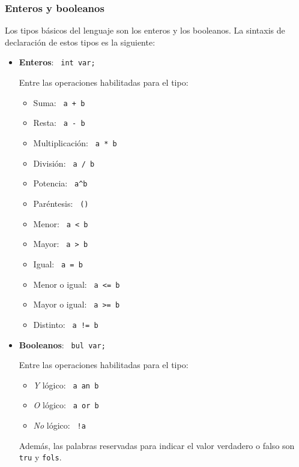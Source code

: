 \documentclass[10pt,a4paper]{article}
\begin{document}
\subsubsection{Enteros y booleanos}
Los tipos básicos del lenguaje son los enteros y los booleanos. La sintaxis de declaración de estos tipos es la siguiente:
\begin{itemize}
    \item \textbf{Enteros}: \texttt{\color{blue} int var;}
    
    Entre las operaciones habilitadas para el tipo:
    \begin{itemize}
        \item Suma: \texttt{\color{blue} a + b}
        \item Resta: \texttt{\color{blue} a - b}
        \item Multiplicación: \texttt{\color{blue} a * b}
        \item División: \texttt{\color{blue} a / b}
        \item Potencia: \texttt{\color{blue} a\^{}b}
        \item Paréntesis: \texttt{\color{blue} ()}
        \item Menor: \texttt{\color{blue} a \textless{} b}
        \item Mayor: \texttt{\color{blue} a \textgreater{} b}
        \item Igual: \texttt{\color{blue} a = b}
        \item Menor o igual: \texttt{\color{blue} a \textless{}= b}
        \item Mayor o igual: \texttt{\color{blue} a \textgreater{}= b}
        \item Distinto: \texttt{\color{blue} a != b}
    \end{itemize}
    \item \textbf{Booleanos}: \texttt{\color{blue} bul var;}
    
    Entre las operaciones habilitadas para el tipo:
    \begin{itemize}
        \item \textit{Y} lógico: \texttt{\color{blue} a an b}
        \item \textit{O} lógico: \texttt{\color{blue} a or b}
        \item \textit{No} lógico: \texttt{\color{blue} !a}
    \end{itemize}
    Además, las palabras reservadas para indicar el valor verdadero o falso son \texttt{\color{blue}tru} y \texttt{\color{blue}fols}.
\end{itemize}
\end{document}
